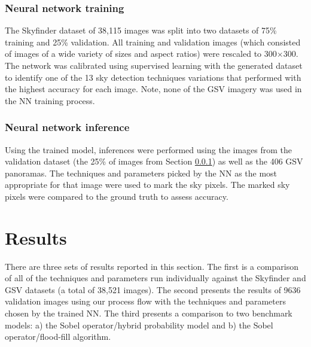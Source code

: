 \documentclass[final,3p,times,authoryear]{elsarticle}
\begin{document}
\subsubsection{Neural network training}\label{sec:nntraining}    

The Skyfinder dataset of 38,115 images was split into two datasets of 75\% training and 25\% validation. All training and validation images (which consisted of images of a wide variety of sizes and aspect ratios) were rescaled to 300$\times$300. The network was calibrated using supervised learning with the generated dataset to identify one of the 13 sky detection techniques variations that performed with the highest accuracy for each image. Note, none of the GSV imagery was used in the NN training process.





\subsubsection{Neural network inference}\label{sec:nninference}    
Using the trained model, inferences were performed using the images from the validation dataset (the 25\% of images from Section \ref{sec:nntraining}) as well as the 406 GSV panoramas. The techniques and parameters picked by the NN as the most appropriate for that image were used to mark the sky pixels. The marked sky pixels were compared to the ground truth to assess accuracy.



\section{Results}\label{sec:results}


There are three sets of results reported in this section. The first is a comparison of all of the techniques and parameters run individually against the Skyfinder and GSV datasets (a total of 38,521 images). The second presents the results of 9636  validation images using our process flow with the techniques and parameters chosen by the trained NN. The third presents a comparison to two benchmark models: a) the \cite{Wang2015a} Sobel operator/hybrid probability model and b) the \cite{Middel2018} Sobel operator/flood-fill algorithm.
\end{document}
